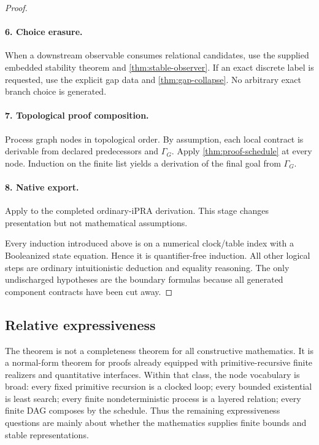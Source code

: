 \begin{proof}
\paragraph{6. Choice erasure.}
When a downstream observable consumes relational candidates, use the supplied embedded
stability theorem and \cref{thm:stable-observer}.  If an exact discrete label is
requested, use the explicit gap data and \cref{thm:gap-collapse}.  No arbitrary exact
branch choice is generated.

\paragraph{7. Topological proof composition.}
Process graph nodes in topological order.  By assumption, each local contract is
derivable from declared predecessors and \(\Gamma_G\).  Apply
\cref{thm:proof-schedule} at every node.  Induction on the finite list yields a
derivation of the final goal from \(\Gamma_G\).

\paragraph{8. Native export.}
Apply  to the completed ordinary-iPRA derivation.  This stage
changes presentation but not mathematical assumptions.

Every induction introduced above is on a numerical clock/table index with a
Booleanized state equation.  Hence it is quantifier-free induction.  All other logical
steps are ordinary intuitionistic deduction and equality reasoning.  The only
undischarged hypotheses are the boundary formulas because all generated component
contracts have been cut away.
\end{proof}

\subsection{Relative expressiveness}

The theorem is not a completeness theorem for all constructive mathematics.  It is a
normal-form theorem for proofs already equipped with primitive-recursive finite
realizers and quantitative interfaces.  Within that class, the node vocabulary is
broad: every fixed primitive recursion is a clocked loop; every bounded existential is
least search; every finite nondeterministic process is a layered relation; every finite
DAG composes by the schedule.  Thus the remaining expressiveness questions are mainly
about whether the mathematics supplies finite bounds and stable representations.

